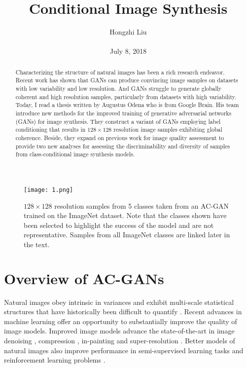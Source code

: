 \documentclass[10pt,twocolumn,letterpaper]{article}
\title{Conditional Image Synthesis}
\author{Hongzhi Liu\\\\
July 8, 2018}
\begin{document}
\maketitle
\begin{abstract}
	Characterizing the structure of natural images has been a rich research endeavor. Recent work has shown that GANs can produce convincing image  samples on datasets with low variability and low resolution. And GANs struggle to generate globally coherent and high resolution samples, particularly from datasets with high variability. Today, I read a thesis written by Augustus Odena who is from Google Brain. His team introduce new methods for the improved training of generative adversarial networks (GANs) for image synthesis. They construct a variant of GANs employing label conditioning that results in $128\times 128$ resolution image samples exhibiting global coherence. Beside, they expand on previous work for image quality assessment to provide two new analyses for assessing the discriminability and diversity of samples from class-conditional image synthesis models.
\end{abstract}

\begin{figure*}[!b]
	\begin{center}
		\texttt{[image: 1.png]}
	\end{center}
	\caption{$128\times 128$ resolution samples from 5 classes taken from an AC-GAN trained on the ImageNet dataset. Note that the classes shown have been selected to highlight the success of the model and are not representative. Samples from all ImageNet classes are linked later in the text.}
	\label{p1}
\end{figure*}
\section{Overview of AC-GANs}

Natural images obey intrinsic in variances and exhibit multi-scale statistical structures that have historically been difficult to quantify \cite{Simoncelli2001Natural}. Recent advances in machine learning offer an opportunity to substantially improve the quality of image models. Improved image models advance the state-of-the-art in image denoising \cite{Ball2015Density}, compression \cite{Toderici2017Full}, in-painting \cite{Galliani2017Learned} and super-resolution \cite{Ledig2017Photo}. Better models of natural images also improve performance in semi-supervised learning tasks \cite{Kingma2014Semi} and reinforcement learning problems .
\end{document}

